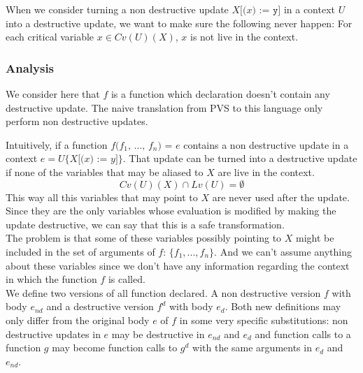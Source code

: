 \documentclass[12pt,a4paper]{article}
\newcommand{\cl}[1]{\texttt{#1}}
\newcommand{\ucont}[1]{\{#1\}}
\begin{document}
When we consider turning a non destructive update $X\cl{[(}x\cl{) := } \cl{y} \cl{]}$ in a context $U$ into a destructive update, we want to make sure the following never happen:
For each critical variable $x \in Cv(U)(X)$, $x$ is not live in the context.






\subsubsection{Analysis}

We consider here that $f$ is a function which declaration doesn't contain any destructive update. The naive translation from PVS to this language only perform non destructive updates.

Intuitively, if a function $f\cl{(}f_1\cl{, } ... \cl{, } f_n\cl{) = } e$ contains a non destructive update in a context $e = U\ucont{X\cl{[(}x\cl{) := }y\cl{]}}$. That update can be turned into a destructive update if none of the variables that may be aliased to $X$ are live in the context.
$$ Cv(U)(X) \cap Lv(U) = \emptyset $$
This way all this variables that may point to $X$ are never used after the update. Since they are the only variables whose evaluation is modified by making the update destructive, we can say that this is a safe transformation.\\

The problem is that some of these variables possibly pointing to $X$ might be included in the set of arguments of $f$: $\{f_1, ... , f_n\}$. And we can't assume anything about these variables since we don't have any information regarding the context in which the function $f$ is called.\\

We define two versions of all function declared. A non destructive version $f$ with body $e_{nd}$ and a destructive version $f^d$ with body $e_d$.
Both new definitions may only differ from the original body $e$ of $f$ in some very specific substitutions: non destructive updates in $e$ may be destructive in $e_{nd}$ and $e_d$ and function calls to a function $g$ may become function calls to $g^d$ with the same arguments in $e_d$ and $e_{nd}$.\\
\end{document}
